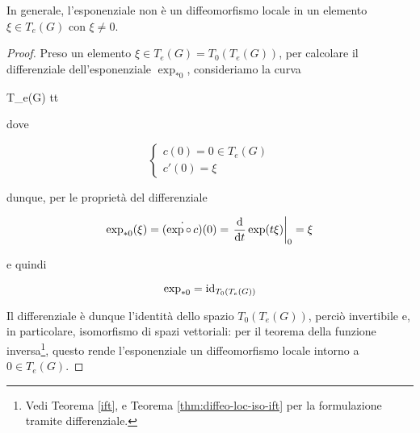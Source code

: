 \begin{remark}
	In generale, l'esponenziale non è un diffeomorfismo locale in un elemento $ \xi \in T_{e}(G) $ con $ \xi \neq 0 $.
\end{remark}

\begin{proof}
	Preso un elemento $ \xi \in T_{e}(G) = T_{0}(T_{e}(G)) $, per calcolare il differenziale dell'esponenziale $ \exp_{*0} $, consideriamo la curva
	
		{\R}{T_{e}(G)}
		{t}{t \xi}
	
	dove
	
	\begin{equation}
		\begin{cases}
			c(0) = 0 \in T_{e}(G) \\
			c'(0) = \xi
		\end{cases}
	\end{equation}
	
	dunque, per le proprietà del differenziale
	
	\begin{equation}
		\exp_{*0} (\xi) = \dot{(\exp \circ \, c)}(0) %
		= \eval{ \dv{t} \exp(t \xi) }_{0} %
		= \xi
	\end{equation}

	e quindi
	
	\begin{equation}
		\exp_{*0} = \operatorname{id}_{T_{0}(T_{e}(G))}
	\end{equation}
	
	Il differenziale è dunque l'identità dello spazio $ T_{0}(T_{e}(G)) $, perciò invertibile e, in particolare, isomorfismo di spazi vettoriali: per il teorema della funzione inversa\footnote{%
		Vedi Teorema \ref{ift}, e Teorema \ref{thm:diffeo-loc-iso-ift} per la formulazione tramite differenziale.%
	}, questo rende l'esponenziale un diffeomorfismo locale intorno a $ 0 \in T_{e}(G) $.
\end{proof}

